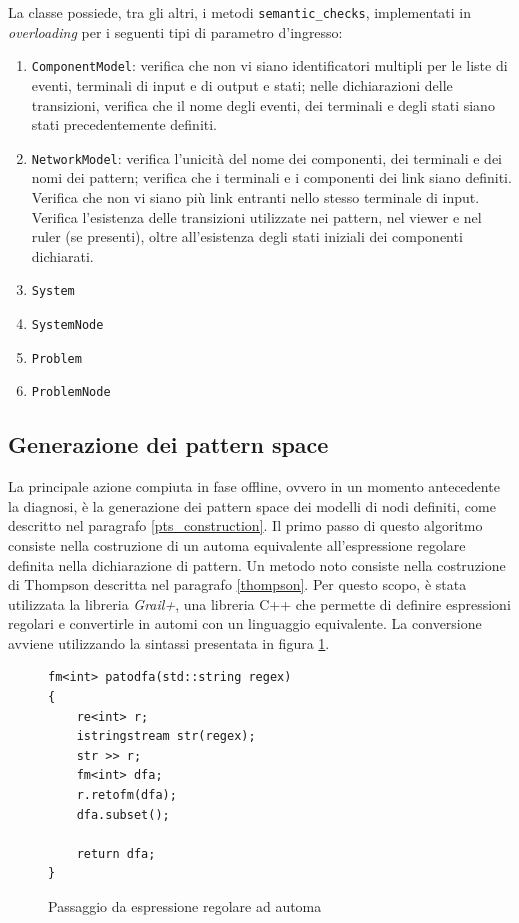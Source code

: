 La classe possiede, tra gli altri, i metodi \verb|semantic_checks|, implementati in \emph{overloading} per i seguenti tipi di parametro d'ingresso:
\begin{enumerate}
\item \verb|ComponentModel|: verifica che non vi siano identificatori multipli per le liste di eventi, terminali di input e di output e stati; nelle dichiarazioni delle transizioni, verifica che il nome degli eventi, dei terminali e degli stati siano stati precedentemente definiti. 
\item \verb|NetworkModel|: verifica l'unicità del nome dei componenti, dei terminali e dei nomi dei pattern;
verifica che i terminali e i componenti dei link siano definiti. Verifica che non vi siano più link entranti nello stesso terminale di input. Verifica l'esistenza delle transizioni utilizzate nei pattern, nel viewer e nel ruler (se presenti), oltre all'esistenza degli stati iniziali dei componenti dichiarati.
\item \verb|System|
\item \verb|SystemNode|
\item \verb|Problem|
\item \verb|ProblemNode|
\end{enumerate}


\subsection{Generazione dei pattern space}
La principale azione compiuta in fase offline, ovvero in un momento antecedente la diagnosi, è la generazione dei pattern space dei modelli di nodi definiti, come descritto nel paragrafo \ref{pts_construction}. 
Il primo passo di questo algoritmo consiste nella costruzione di un automa equivalente all'espressione regolare definita nella dichiarazione di pattern. Un metodo noto consiste nella costruzione di Thompson descritta nel paragrafo \ref{thompson}. 
Per questo scopo, è stata utilizzata la libreria \emph{Grail+}\cite{web:grail}, una libreria C++ che permette di definire espressioni regolari e convertirle in automi con un linguaggio equivalente.
La conversione avviene utilizzando la sintassi presentata in figura \ref{code:patodfa}.

\begin{figure}[htbp]
\begin{verbatim}
fm<int> patodfa(std::string regex)
{
    re<int> r;
    istringstream str(regex);
    str >> r;
    fm<int> dfa;
    r.retofm(dfa);
    dfa.subset();

    return dfa;
}
\end{verbatim}
\caption{Passaggio da espressione regolare ad automa}
\label{code:patodfa}
\end{figure}

